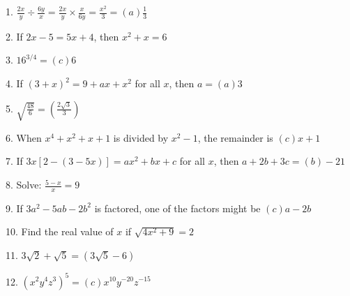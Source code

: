 \documentclass{article}
\begin{document}
1. \(\frac{2x}{y} \div \frac{6y}{x} = \frac{2x}{y} \times \frac{x}{6y} = \frac{x^2}{3} = \boxed{(a) \frac{1}{3}}\)

2. If \(2x - 5 = 5x + 4\), then \(x^2 + x = 6\)

3. \(16^{3/4} = \boxed{(c) 6}\)

4. If \((3 + x)^2 = 9 + ax + x^2\) for all \(x\), then \(a = \boxed{(a) 3}\)

5. \(\sqrt{\frac{48}{6}} = \boxed{\left(\frac{2\sqrt{3}}{3}\right)}\)

6. When \(x^4 + x^2 + x + 1\) is divided by \(x^2 - 1\), the remainder is \(\boxed{(c) x + 1}\)

7. If \(3x[2 - (3 - 5x)] = ax^2 +bx + c\) for all \(x\), then \(a + 2b + 3c = \boxed{(b) -21}\)

8. Solve: \(\frac{5-x}{x} = 9\)

9. If \(3a^2 - 5ab - 2b^2\) is factored, one of the factors might be \(\boxed{(c) a - 2b}\)

10. Find the real value of \(x\) if \(\sqrt{4x^2 + 9} = 2\)

11. \(3\sqrt{2} + \sqrt{5} = \boxed{\left(3\sqrt{5} - 6\right)}\)

12. \((x^2y^4z^3)^5 = \boxed{(c) x^{10}y^{-20}z^{-15}}\)
\end{document}
